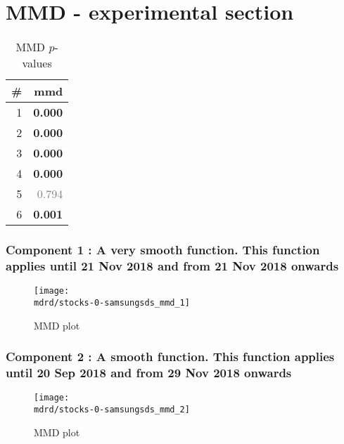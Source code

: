 \documentclass{article} %
\begin{document}
\section{MMD - experimental section}
\label{sec:mmd}

\begin{table}[htb]
\begin{center}
{\small
\begin{tabular}{|r|r|}
\hline
\bf{\#} & {mmd}\\
\hline

1 & \textbf{0.000}\\

2 & \textbf{0.000}\\

3 & \textbf{0.000}\\

4 & \textbf{0.000}\\

5 & \textcolor{gray}{0.794}\\

6 & \textbf{0.001}\\

\hline
\end{tabular}
\caption{
MMD $p$-values
}
\label{table:mmd}
}
\end{center}
\end{table}

\subsubsection{Component 1 : A very smooth function. This function applies until 21 Nov 2018 and from 21 Nov 2018 onwards}

\begin{figure}[H]
\newcommand{\wmgd}{0.5\columnwidth}
\newcommand{\hmgd}{3.0cm}
\newcommand{\mdrd}{stocks-0-samsungsds}
\newcommand{\mbm}{\hspace{-0.3cm}}
\texttt{[image: \\mdrd/stocks-0-samsungsds\_mmd\_1]}
\caption{
MMD plot}
\label{fig:mmd1}
\end{figure}

\subsubsection{Component 2 : A smooth function. This function applies until 20 Sep 2018 and from 29 Nov 2018 onwards}

\begin{figure}[H]
\newcommand{\wmgd}{0.5\columnwidth}
\newcommand{\hmgd}{3.0cm}
\newcommand{\mdrd}{stocks-0-samsungsds}
\newcommand{\mbm}{\hspace{-0.3cm}}
\texttt{[image: \\mdrd/stocks-0-samsungsds\_mmd\_2]}
\caption{
MMD plot}
\label{fig:mmd2}
\end{figure}
\end{document}

